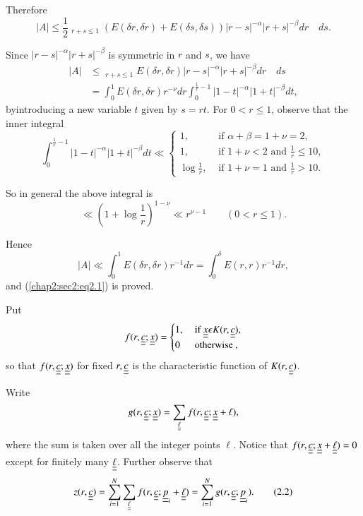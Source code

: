 Therefore
$$
|A| \leq \frac{1}{2} \mathop{\int_{0}^{1} \int_{0}^{1}}_{r+s \leq 1} (E(\delta r, \delta r) + E(\delta s, \delta s)) |r-s|^{-\alpha} |r+s|^{-\beta} dr \quad ds.
$$

Since $|r-s|^{-\alpha} |r+s|^{-\beta}$ is symmetric in $r$ and $s$, we have
\begin{align*}
|A| & \leq \mathop{\int_{0}^{1} \int_{0}^{1}}_{r+s \leq 1} E(\delta r, \delta r) |r-s|^{-\alpha} |r+s|^{-\beta} dr \quad ds\\
& = \int_{0}^{1} E(\delta r, \delta r)r^{-\nu} dr \int_{0}^{\frac{1}{r} - 1} |1 - t|^{-\alpha} |1 + t|^{-\beta} dt,
\end{align*}
by\pageoriginale introducing a new variable $t$ given by $s = rt$. For $0 < r \leq 1$, observe that the inner integral 
\begin{equation*}
\int_{0}^{\frac{1}{r} - 1} |1 - t|^{-\alpha} |1 + t|^{-\beta} dt \ll
 \begin{cases}
  1, & \text{ if } \alpha + \beta = 1 + \nu = 2,\\
  1, & \text{ if } 1 + \nu < 2 \text{ and } \frac{1}{r} \leq 10,\\
  \log \frac{1}{r}, & \text{ if } 1 + \nu = 1 \text{ and } \frac{1}{r} > 10.
 \end{cases}
\end{equation*}

So in general the above integral is
$$
\ll (1 + \log \frac{1}{r})^{1-\nu} \ll r^{\nu -1} \qquad (0 < r \leq 1).
$$

Hence 
$$
|A| \ll \int_{0}^{1} E(\delta r, \delta r) r^{-1} dr = \int_{0}^{\delta} E(r, r) r^{-1} dr,
$$
and (\ref{chap2:sec2:eq2.1}) is proved.

Put 
\begin{equation*}
f(r, \underline{\underline{c}}; \underline{\underline{x}}) = 
 \begin{cases}
  1, & \text{ if } \underline{\underline{x}} \epsilon K(r, \underline{\underline{c}}),\\
  0 & \text{ otherwise },
 \end{cases}
\end{equation*}
so that $f(r, \underline{\underline{c}} ; \underline{\underline{x}})$ for fixed $r, \underline{\underline{c}}$ is the characteristic function of $K(r, \underline{\underline{c}})$.

Write
$$
g(r, \underline{\underline{c}} ; \underline{\underline{x}}) = \sum_{\underline{\underline{\ell}}} f(r, \underline{\underline{c}} ; \underline{\underline{x}} + \ell),
$$
where the sum is taken over all the integer points $\ell$. Notice that $f(r, \underline{\underline{c}} ; \underline{\underline{x}} + \underline{\underline{\ell}}) = 0$ except for finitely many $\underline{\underline{\ell}}$. Further observe that
\begin{equation*}
z(r, \underline{\underline{c}}) = \sum_{i=1}^{N} \sum_{\underline{\underline{\ell}}} f(r, \underline{\underline{c}} ; \underline{\underline{p}}_{i} + \underline{\underline{\ell}}) = \sum_{i=1}^{N} g(r, \underline{\underline{c}} ; \underline{\underline{p}}_{i}).\tag{2.2}\label{chap2:sec2:eq2.2}
\end{equation*}

